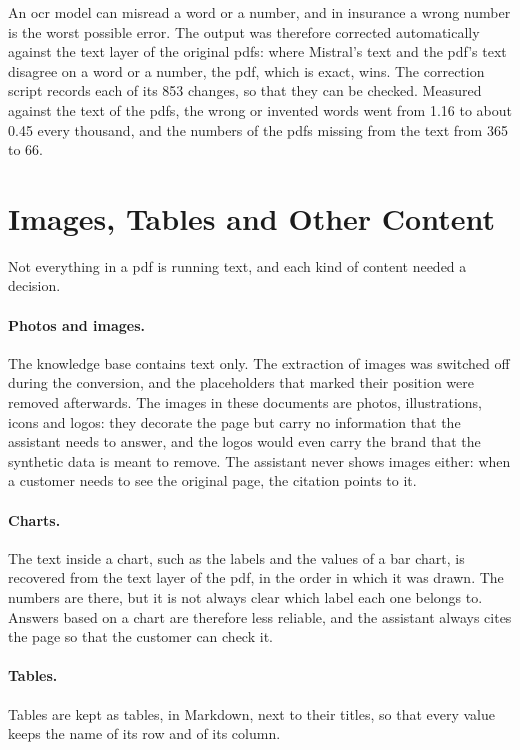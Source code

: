 An \ac{ocr} model can misread a word or a number, and in insurance a wrong number is the worst
possible error. The output was therefore corrected automatically against the text layer of the
original \acsp{pdf}: where Mistral's text and the \ac{pdf}'s text disagree on a word or a number,
the \ac{pdf}, which is exact, wins. The correction script records each of its 853 changes, so that
they can be checked. Measured against the text of the \acsp{pdf}, the wrong or invented words went
from 1.16 to about 0.45 every thousand, and the numbers of the \acsp{pdf} missing from the text
from 365 to 66.

\section{Images, Tables and Other Content}
\label{sec:non-text}

Not everything in a \ac{pdf} is running text, and each kind of content needed a decision.

\paragraph{Photos and images.} The knowledge base contains text only. The extraction of images was
switched off during the conversion, and the placeholders that marked their position were removed
afterwards. The images in these documents are photos, illustrations, icons and logos: they decorate
the page but carry no information that the assistant needs to answer, and the logos would even
carry the brand that the synthetic data is meant to remove. The assistant never shows images
either: when a customer needs to see the original page, the citation points to it.

\paragraph{Charts.} The text inside a chart, such as the labels and the values of a bar chart, is
recovered from the text layer of the \ac{pdf}, in the order in which it was drawn. The numbers are
there, but it is not always clear which label each one belongs to. Answers based on a chart are
therefore less reliable, and the assistant always cites the page so that the customer can check it.

\paragraph{Tables.} Tables are kept as tables, in Markdown, next to their titles, so that every
value keeps the name of its row and of its column.


